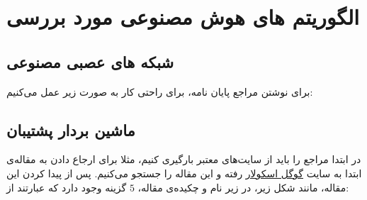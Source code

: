 \chapter{الگوریتم های هوش مصنوعی مورد بررسی}
\section{شبکه های عصبی مصنوعی}
برای نوشتن مراجع پایان نامه، برای راحتی کار به صورت زیر عمل می‌کنیم:
\section{ماشین بردار پشتیبان}
در ابتدا مراجع را باید از سایت‌های معتبر بارگیری کنیم، مثلا برای ارجاع دادن به مقاله‌ی
ابتدا به سایت
\href{scholar.google.com}{گوگل اسکولار} 
رفته و این مقاله را جستجو می‌کنیم. پس از پیدا کردن این مقاله، مانند شکل زیر، در زیر نام و چکیده‌ی مقاله، $5$ گزینه وجود دارد که عبارتند از:\\

